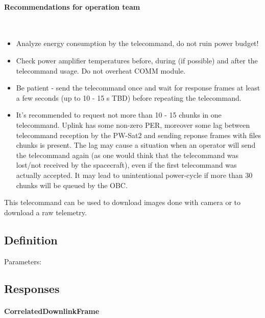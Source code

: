 \paragraph{Recommendations for operation team} \mbox{} \\
\begin{itemize}
    \item Analyze energy consumption by the telecommand, do not ruin power budget!
    \item Check power amplifier temperatures before, during (if possible) and after the telecommand usage. Do not overheat COMM module.
    \item Be patient - send the telecommand once and wait for response frames at least a few seconds (up to 10 - 15 s TBD) before repeating the telecommand.
    \item It's recommended to request not more than 10 - 15 chunks in one telecommand. Uplink has some non-zero PER, moreover some lag between telecommand reception by
    the PW-Sat2 and sending reponse frames with files chunks is present. The lag may cause a situation when an operator will send the telecommand again (as one would think that the telecommand was lost/not received by the spacecraft), even if the first telecommand was actually accepted. It may lead to unintentional power-cycle if more than 30 chunks will be queued by the OBC.
\end{itemize}
This telecommand can be used to download images done with camera or to download a raw telemetry.

\subsection{Definition}

Parameters: 

\begin{tcarglist}
\end{tcarglist}

\subsection{Responses}

\paragraph{CorrelatedDownlinkFrame}

